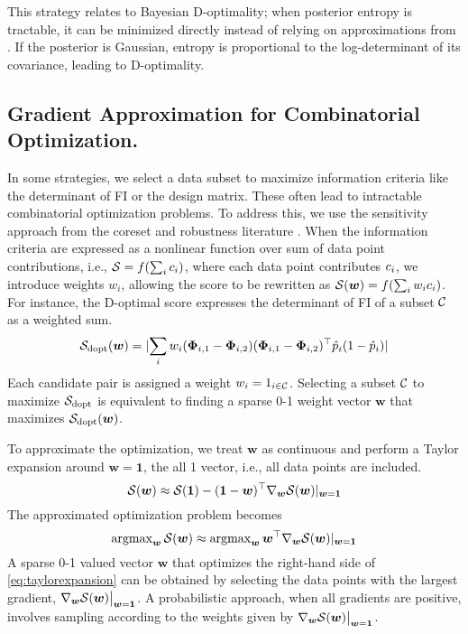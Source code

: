 This strategy relates to Bayesian D-optimality; when posterior entropy is tractable, it can be minimized directly instead of relying on approximations from \citet{houlsby2011bayesian}. If the posterior is Gaussian, entropy is proportional to the log-determinant of its covariance, leading to D-optimality.

\subsection{Gradient Approximation for Combinatorial Optimization.}
In some strategies, we select a data subset to maximize information criteria like the determinant of FI or the design matrix. These often lead to intractable combinatorial optimization problems. To address this, we use the sensitivity approach from the coreset and robustness literature \citep{huggins2016coresets, campbell2018bayesian, campbell2019automated}. When the information criteria are expressed as a nonlinear function over sum of data point contributions, i.e., $\mathcal{S} = f(\sum_{i} c_i)$, where each data point contributes $c_i$, we introduce weights $w_i$, allowing the score to be rewritten as $\mathcal{S}(\bm{w}) = f(\sum_{i} w_i c_i)$. For instance, the D-optimal score expresses the determinant of FI of a subset $\mathcal{C}$ as a weighted sum.
\begin{equation}
    \mathcal{S}_{\text{dopt}}(\bm{w}) = \lvert \sum_{i} w_i (\bm{\Phi}_{i,1}-\bm{\Phi}_{i,2})(\bm{\Phi}_{i,1}-\bm{\Phi}_{i,2})^\top \hat{p}_{i}(1-\hat{p}_{i})\rvert
\end{equation}
Each candidate pair is assigned a weight $w_i = 1_{i\in \mathcal{C}}$. Selecting a subset $\mathcal{C}$ to maximize $\mathcal{S}_{\text{dopt}}$ is equivalent to finding a sparse 0-1 weight vector $\bm{w}$ that maximizes $\mathcal{S}_{\text{dopt}}(\bm{w})$.

To approximate the optimization, we treat $\bm{w}$ as continuous and perform a Taylor expansion around $\bm{w} = \bm{1}$, the all 1 vector, i.e., all data points are included.
\begin{equation}
   \mathcal{S}(\bm w)\approx \mathcal{S}(\bm 1) - (\bm 1-\bm{w})^\top \nabla_{\bm w} \mathcal{S}(\bm w)|_{\bm w=\bm 1}
   \label{eq:taylorexpansion}
\end{equation}
The approximated optimization problem becomes
\begin{equation}
    \operatorname{argmax}_{\bm w}\mathcal{S}(\bm w)\approx \operatorname{argmax}_{\bm w} \bm{w}^\top \nabla_{\bm w} \mathcal{S}(\bm w)|_{\bm w=\bm 1}
\end{equation}
A sparse 0-1 valued vector $\bm w$ that optimizes the right-hand side of \cref{eq:taylorexpansion} can be obtained by selecting the data points with the largest gradient, $\nabla_{\bm w} \mathcal{S}(\bm w) \big|_{\bm w = \bm 1}$. A probabilistic approach, when all gradients are positive, involves sampling according to the weights given by $\nabla_{\bm w} \mathcal{S}(\bm w) \big|_{\bm w = \bm 1}$. 



